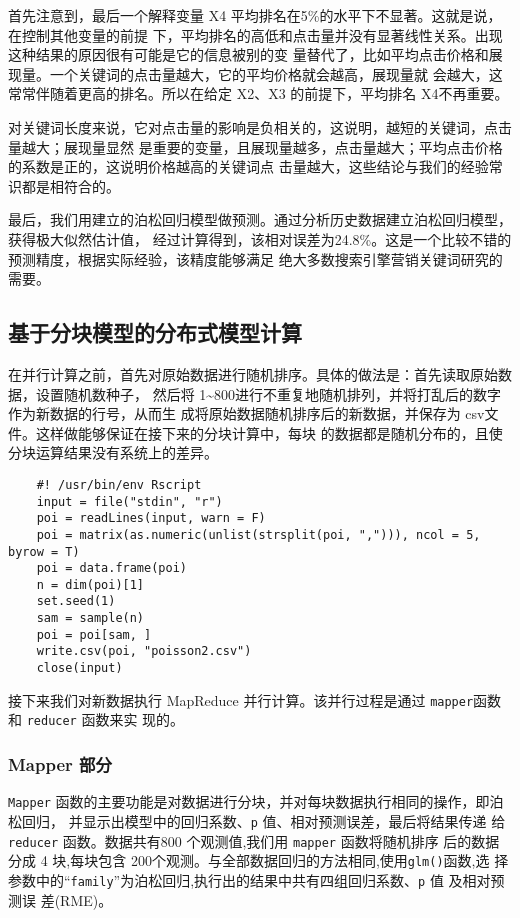 首先注意到，最后一个解释变量 X4 平均排名在5\%的水平下不显著。这就是说，在控制其他变量的前提
下，平均排名的高低和点击量并没有显著线性关系。出现这种结果的原因很有可能是它的信息被别的变
量替代了，比如平均点击价格和展现量。一个关键词的点击量越大，它的平均价格就会越高，展现量就
会越大，这常常伴随着更高的排名。所以在给定 X2、X3 的前提下，平均排名 X4不再重要。

对关键词长度来说，它对点击量的影响是负相关的，这说明，越短的关键词，点击量越大；展现量显然
是重要的变量，且展现量越多，点击量越大；平均点击价格的系数是正的，这说明价格越高的关键词点
击量越大，这些结论与我们的经验常识都是相符合的。

最后，我们用建立的泊松回归模型做预测。通过分析历史数据建立泊松回归模型，获得极大似然估计值，
经过计算得到，该相对误差为24.8\%。这是一个比较不错的预测精度，根据实际经验，该精度能够满足
绝大多数搜索引擎营销关键词研究的需要。

\subsection{基于分块模型的分布式模型计算}\label{ux57faux4e8eux5206ux5757ux6a21ux578bux7684ux5206ux5e03ux5f0fux6a21ux578bux8ba1ux7b97}

在并行计算之前，首先对原始数据进行随机排序。具体的做法是：首先读取原始数据，设置随机数种子，
然后将 1\textasciitilde{}800进行不重复地随机排列，并将打乱后的数字作为新数据的行号，从而生
成将原始数据随机排序后的新数据，并保存为 csv文件。这样做能够保证在接下来的分块计算中，每块
的数据都是随机分布的，且使分块运算结果没有系统上的差异。

\begin{lstlisting}
	#! /usr/bin/env Rscript
	input = file("stdin", "r")
	poi = readLines(input, warn = F)
	poi = matrix(as.numeric(unlist(strsplit(poi, ","))), ncol = 5, byrow = T)
	poi = data.frame(poi)
	n = dim(poi)[1]
	set.seed(1)
	sam = sample(n)
	poi = poi[sam, ]
	write.csv(poi, "poisson2.csv")
	close(input)
\end{lstlisting}

接下来我们对新数据执行 MapReduce 并行计算。该并行过程是通过 \lstinline!mapper!函数和
\lstinline!reducer! 函数来实 现的。

\subsubsection{Mapper 部分}\label{mapper-ux90e8ux5206}

\lstinline!Mapper! 函数的主要功能是对数据进行分块，并对每块数据执行相同的操作，即泊松回归，
并显示出模型中的回归系数、\lstinline!p! 值、相对预测误差，最后将结果传递
给 \lstinline!reducer! 函数。数据共有800 个观测值,我们用 \lstinline!mapper! 函数将随机排序
后的数据分成 4 块,每块包含 200个观测。与全部数据回归的方法相同,使用\lstinline!glm()!函数,选
择参数中的``\lstinline!family!''为泊松回归,执行出的结果中共有四组回归系数、\lstinline!p! 值
及相对预测误 差(RME)。

